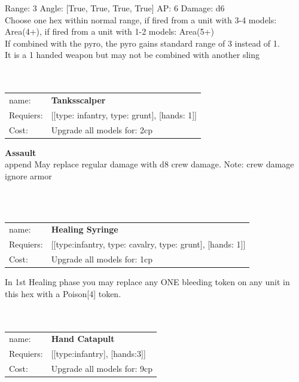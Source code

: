 Range: 3  Angle: [True, True, True, True] AP: 6 Damage: d6 \\
Choose one hex within normal range, if fired from a unit with 3-4 models: Area(4+), if fired from a unit with 1-2 models: Area(5+)\\ 
If combined with the pyro, the pyro gains standard range of 3 instead of 1.\\ 
It is a 1 handed weapon but may not be combined with another sling\\ 








\ \\
\ \\
\begin{tabular}{ll}
name: & {\bf Tanksscalper } \\
Requiers: & [[type: infantry, type: grunt], [hands: 1]] \\
Cost: & Upgrade all models for: 2cp \\
\end{tabular}





{\bf Assault} \ \\

append May replace regular damage with d8 crew damage. Note: crew damage ignore armor


\ \\
\ \\
\begin{tabular}{ll}
name: & {\bf Healing Syringe } \\
Requiers: & [[type:infantry, type: cavalry, type: grunt], [hands: 1]] \\
Cost: & Upgrade all models for: 1cp \\
\end{tabular}

In 1st Healing phase you may replace any ONE bleeding token on any unit in this hex with a Poison[4] token.\\ 









\ \\
\ \\
\begin{tabular}{ll}
name: & {\bf Hand Catapult } \\
Requiers: & [[type:infantry], [hands:3]] \\
Cost: & Upgrade all models for: 9cp \\
\end{tabular}



